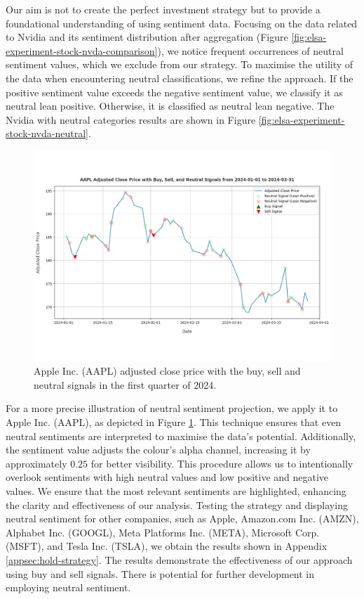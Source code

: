 Our aim is not to create the perfect investment strategy but to provide a foundational understanding of using sentiment data. Focusing on the data related to Nvidia and its sentiment distribution after aggregation (Figure \ref{fig:elsa-experiment-stock-nvda-comparison}), we notice frequent occurrences of neutral sentiment values, which we exclude from our strategy. To maximise the utility of the data when encountering neutral classifications, we refine the approach. If the positive sentiment value exceeds the negative sentiment value, we classify it as neutral lean positive. Otherwise, it is classified as neutral lean negative. The Nvidia with neutral categories results are shown in Figure \ref{fig:elsa-experiment-stock-nvda-neutral}.

\begin{figure}[hb]
    \centering
    \includegraphics[width=\textwidth]{img/experiment-stock/aapl-neutral-a.pdf}
    \caption{Apple Inc. (AAPL) adjusted close price with the buy, sell and neutral signals in the first quarter of 2024.}
    \label{fig:elsa-experiment-stock-aapl-neutral}
\end{figure}

For a more precise illustration of neutral sentiment projection, we apply it to Apple Inc. (AAPL), as depicted in Figure \ref{fig:elsa-experiment-stock-aapl-neutral}. This technique ensures that even neutral sentiments are interpreted to maximise the data's potential. Additionally, the sentiment value adjusts the colour's alpha channel, increasing it by approximately $0.25$ for better visibility. This procedure allows us to intentionally overlook sentiments with high neutral values and low positive and negative values. We ensure that the most relevant sentiments are highlighted, enhancing the clarity and effectiveness of our analysis. Testing the strategy and displaying neutral sentiment for other companies, such as Apple, Amazon.com Inc. (AMZN), Alphabet Inc. (GOOGL), Meta Platforms Inc. (META), Microsoft Corp. (MSFT), and Tesla Inc. (TSLA), we obtain the results shown in Appendix \ref{appsec:hold-strategy}. The results demonstrate the effectiveness of our approach using buy and sell signals. There is potential for further development in employing neutral sentiment.

